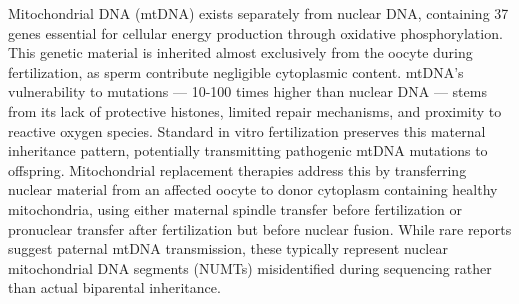 Mitochondrial DNA (mtDNA) exists separately from nuclear DNA, containing 37 genes essential for cellular energy production through oxidative phosphorylation. This genetic material is inherited almost exclusively from the oocyte during fertilization, as sperm contribute negligible cytoplasmic content. mtDNA's vulnerability to mutations — 10-100 times higher than nuclear DNA — stems from its lack of protective histones, limited repair mechanisms, and proximity to reactive oxygen species. Standard in vitro fertilization preserves this maternal inheritance pattern, potentially transmitting pathogenic mtDNA mutations to offspring. Mitochondrial replacement therapies address this by transferring nuclear material from an affected oocyte to donor cytoplasm containing healthy mitochondria, using either maternal spindle transfer before fertilization or pronuclear transfer after fertilization but before nuclear fusion. While rare reports suggest paternal mtDNA transmission, these typically represent nuclear mitochondrial DNA segments (NUMTs) misidentified during sequencing rather than actual biparental inheritance.